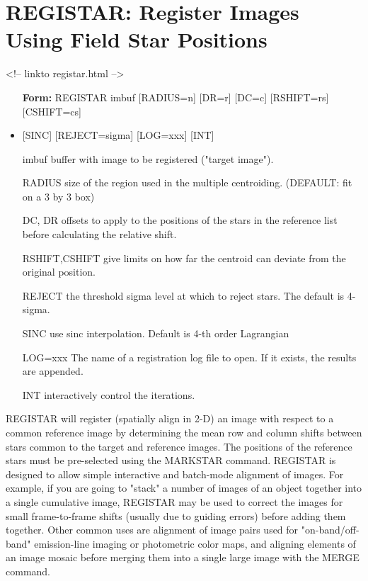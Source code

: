\section{REGISTAR: Register Images Using Field Star Positions}
\begin{rawhtml}
<!-- linkto registar.html -->
\end{rawhtml}

\begin{itemize}
  \item[\textbf{Form: } REGISTAR imbuf {[RADIUS=n]} {[DR=r]} {[DC=c]} 
       {[RSHIFT=rs]} {[CSHIFT=cs]}\hfill]{}
       \item{{[SINC]} {[REJECT=sigma]} {[LOG=xxx]} {[INT]}}
  \item[imbuf]{buffer with image to be registered ("target image").}
  \item[RADIUS]{size of the region used in the multiple centroiding.
       (DEFAULT: fit on a 3 by 3 box)}
  \item[DC, DR]{offsets to apply to the positions of the stars in the
       reference list before calculating the relative shift.}
  \item[RSHIFT,CSHIFT]{give limits on how far the centroid can deviate 
       from the original position.}
  \item[REJECT]{the threshold sigma level at which to reject stars. The
       default is 4-sigma.}
  \item[SINC]{use sinc interpolation. Default is 4-th order Lagrangian}
  \item[LOG=xxx]{The name of a registration log file to open.  If it exists,
       the results are appended.  }
  \item[INT]{interactively control the iterations.}
\end{itemize}

REGISTAR will register (spatially align in 2-D) an image with respect to a
common reference image by determining the mean row and column shifts
between stars common to the target and reference images.  The positions of
the reference stars must be pre-selected using the MARKSTAR command.
REGISTAR is designed to allow simple interactive and batch-mode alignment
of images.  For example, if you are going to "stack" a number of images of
an object together into a single cumulative image, REGISTAR may be used to
correct the images for small frame-to-frame shifts (usually due to guiding
errors) before adding them together.  Other common uses are alignment of
image pairs used for "on-band/off-band" emission-line imaging or
photometric color maps, and aligning elements of an image mosaic before
merging them into a single large image with the MERGE command.

